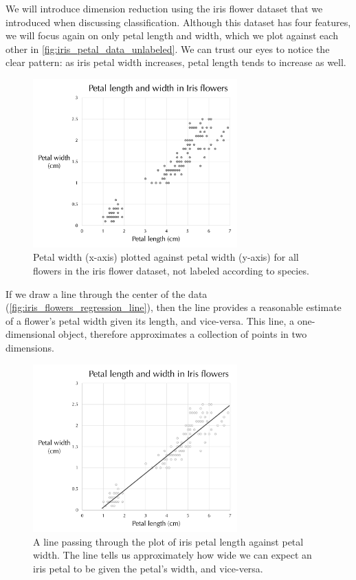 We will introduce dimension reduction using the iris flower dataset that we introduced when discussing classification. Although this dataset has four features, we will focus again on only petal length and width, which we plot against each other in \autoref{fig:iris_petal_data_unlabeled}. We can trust our eyes to notice the clear pattern: as iris petal width increases, petal length tends to increase as well.

\begin{figure}[h]
\centering
\mySfFamily
\includegraphics[width = 0.7\textwidth]{../images/iris_petal_data_unlabeled.png}
\caption{Petal width (x-axis) plotted against petal width (y-axis) for all flowers in the iris flower dataset, not labeled according to species.}
\label{fig:iris_petal_data_unlabeled}
\end{figure}

If we draw a line through the center of the data (\autoref{fig:iris_flowers_regression_line}), then the line provides a reasonable estimate of a flower's petal width given its length, and vice-versa. This line, a one-dimensional object, therefore approximates a collection of points in two dimensions.\\

\begin{figure}[h]
\centering
\mySfFamily
\includegraphics[width = 0.7\textwidth]{../images/iris_flowers_regression_line.png}
\caption{A line passing through the plot of iris petal length against petal width. The line tells us approximately how wide we can expect an iris petal to be given the petal's width, and vice-versa.}
\label{fig:iris_flowers_regression_line}
\end{figure}

